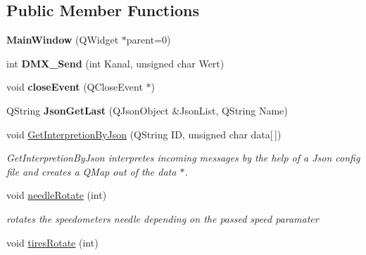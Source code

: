 \subsection*{Public Member Functions}
\begin{DoxyCompactItemize}
\item 
\hypertarget{class_main_window_a8b244be8b7b7db1b08de2a2acb9409db}{}{\bfseries Main\+Window} (Q\+Widget $\ast$parent=0)\label{class_main_window_a8b244be8b7b7db1b08de2a2acb9409db}

\item 
\hypertarget{class_main_window_a4e90dae9d28e99e1a2a708eaf881c485}{}int {\bfseries D\+M\+X\+\_\+\+Send} (int Kanal, unsigned char Wert)\label{class_main_window_a4e90dae9d28e99e1a2a708eaf881c485}

\item 
\hypertarget{class_main_window_a38edb88d43e844aca9d2e762c8706565}{}void {\bfseries close\+Event} (Q\+Close\+Event $\ast$)\label{class_main_window_a38edb88d43e844aca9d2e762c8706565}

\item 
\hypertarget{class_main_window_a3e814c59f07dffe9bd4c12a7d0388026}{}Q\+String {\bfseries Json\+Get\+Last} (Q\+Json\+Object \&Json\+List, Q\+String Name)\label{class_main_window_a3e814c59f07dffe9bd4c12a7d0388026}

\item 
\hypertarget{class_main_window_a392b1075743c22ae41157d62bb6906de}{}void \hyperlink{class_main_window_a392b1075743c22ae41157d62bb6906de}{Get\+Interpretion\+By\+Json} (Q\+String I\+D, unsigned char data\mbox{[}$\,$\mbox{]})\label{class_main_window_a392b1075743c22ae41157d62bb6906de}

\begin{DoxyCompactList}\small\item\em Get\+Interpretion\+By\+Json interpretes incoming messages by the help of a Json config file and creates a Q\+Map out of the data $\ast$. \end{DoxyCompactList}\item 
void \hyperlink{class_main_window_ac3b886aa8279a5f084d3568b35bdbeb2}{needle\+Rotate} (int)
\begin{DoxyCompactList}\small\item\em rotates the speedometer\textquotesingle{}s needle depending on the passed speed paramater \end{DoxyCompactList}\item 
\hypertarget{class_main_window_a23b80f82a61cc0a1e3e2721891c782b8}{}void \hyperlink{class_main_window_a23b80f82a61cc0a1e3e2721891c782b8}{tires\+Rotate} (int)\label{class_main_window_a23b80f82a61cc0a1e3e2721891c782b8}


\end{DoxyCompactItemize}
